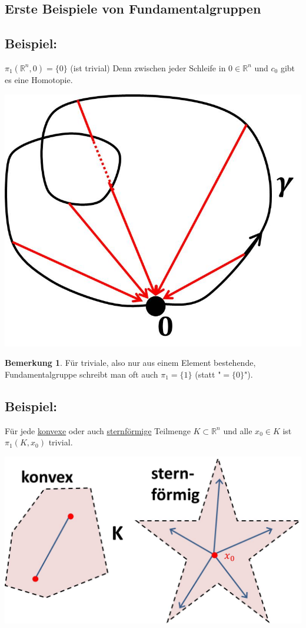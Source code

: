 \documentclass[a4paper,11pt,notitlepage]{report}
\theoremstyle{definition}
\newtheorem{remark}{Bemerkung}[chapter]
\newcommand{\R}{{\ensuremath{\mathbb{R}}}}
\newenvironment{bsp}[1]
{
\setlength{\fboxsep}{10pt}
\subsection*{Beispiel: #1}
\begin{upshape}
}
{
\end{upshape}
}
\begin{document}
\subsection{Erste Beispiele von Fundamentalgruppen}
\begin{bsp}{}
	$\pi_1(\R^n, 0) = \{0\}$ (ist trivial)
	\newline
	Denn zwischen jeder Schleife in $0 \in \R^n$ und $c_0$ gibt es eine Homotopie.
	\begin{center}
		\includegraphics[scale=0.3]{images/Fundamentalgruppe_Rn.jpg}
	\end{center}
\end{bsp}

\begin{remark}{}
	Für triviale, also nur aus einem Element bestehende, Fundamentalgruppe schreibt man oft auch $\pi_1 = \{1\}$ (statt "$=\{0\}$").
\end{remark}

\begin{bsp}{}
	Für jede \underline{konvexe} oder auch \underline{sternförmige} Teilmenge $K \subset \R^n$ und alle $x_0 \in K$ ist $\pi_1(K,x_0)$ trivial.
	\begin{center}
		 \includegraphics[scale=0.4]{images/konvex_sternfoermig.jpg}
	\end{center}
\end{bsp}
\end{document}
